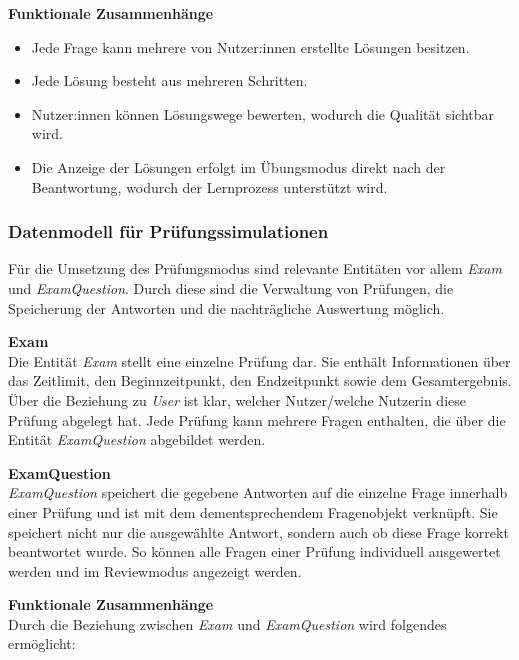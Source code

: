 \vspace{0.2cm}
\textbf{Funktionale Zusammenhänge} \\

\begin{itemize}
  \item Jede Frage kann mehrere von Nutzer:innen erstellte Lösungen besitzen.
  \item Jede Lösung besteht aus mehreren Schritten.
  \item Nutzer:innen können Lösungswege bewerten, wodurch die Qualität sichtbar wird.
  \item Die Anzeige der Lösungen erfolgt im Übungsmodus direkt nach der Beantwortung, wodurch der Lernprozess unterstützt wird.
\end{itemize}



\subsubsection{Datenmodell für Prüfungssimulationen}
Für die Umsetzung des Prüfungsmodus sind relevante Entitäten vor allem \textit{Exam} und \textit{ExamQuestion}. Durch diese sind die
Verwaltung von Prüfungen, die Speicherung der Antworten und die nachträgliche Auswertung möglich.

\vspace{0.2cm}
\textbf{Exam} \\
Die Entität \textit{Exam} stellt eine einzelne Prüfung dar. Sie enthält Informationen über das Zeitlimit, den Beginnzeitpunkt, den 
Endzeitpunkt sowie dem Gesamtergebnis. Über die Beziehung zu \textit{User} ist klar, welcher Nutzer/welche Nutzerin diese Prüfung
abgelegt hat. Jede Prüfung kann mehrere Fragen enthalten, die über die Entität \textit{ExamQuestion} abgebildet werden.

\vspace{0.2cm}
\textbf{ExamQuestion} \\
\textit{ExamQuestion} speichert die gegebene Antworten auf die einzelne Frage innerhalb einer Prüfung und ist mit dem dementsprechendem
Fragenobjekt verknüpft. Sie speichert nicht nur die ausgewählte Antwort, sondern auch ob diese Frage korrekt beantwortet wurde. So
können alle Fragen einer Prüfung individuell ausgewertet werden und im Reviewmodus angezeigt werden.

\vspace{0.2cm}
\textbf{Funktionale Zusammenhänge} \\
Durch die Beziehung zwischen \textit{Exam} und \textit{ExamQuestion} wird folgendes ermöglicht:

